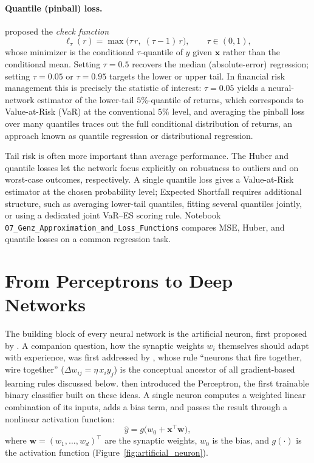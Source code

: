\documentclass[11pt,a4paper]{report}
\newcommand{\x}{\bm{x}}
\newcommand{\w}{\bm{w}}
\begin{document}
\paragraph{Quantile (pinball) loss.}  \citet{koenker1978regression} proposed the \emph{check function}
\begin{equation}
\ell_\tau(r) = \max\!\bigl(\tau\, r,\; (\tau-1)\, r\bigr), \qquad \tau \in (0,1),
\end{equation}
whose minimizer is the conditional $\tau$-quantile of $y$ given $\x$ rather than the conditional mean.  Setting $\tau = 0.5$ recovers the median (absolute-error) regression; setting $\tau = 0.05$ or $\tau = 0.95$ targets the lower or upper tail.  In financial risk management this is precisely the statistic of interest: $\tau = 0.05$ yields a neural-network estimator of the lower-tail $5\%$-quantile of returns, which corresponds to Value-at-Risk (VaR) at the conventional $5\%$ level, and averaging the pinball loss over many quantiles traces out the full conditional distribution of returns, an approach known as quantile regression or distributional regression.

\begin{remarkbox}
Tail risk is often more important than average performance.  The Huber and quantile losses let the network focus explicitly on robustness to outliers and on worst-case outcomes, respectively.  A single quantile loss gives a Value-at-Risk estimator at the chosen probability level; Expected Shortfall requires additional structure, such as averaging lower-tail quantiles, fitting several quantiles jointly, or using a dedicated joint VaR--ES scoring rule.  Notebook \texttt{07\_Genz\_Approximation\_and\_Loss\_Functions} compares MSE, Huber, and quantile losses on a common regression task.
\end{remarkbox}

\section{From Perceptrons to Deep Networks}

The building block of every neural network is the artificial neuron, first proposed by \citet{mcculloch1943logical}.  A companion question, how the synaptic weights $w_i$ themselves should adapt with experience, was first addressed by \citet{hebb1949organization}, whose rule ``neurons that fire together, wire together'' ($\Delta w_{ij} = \eta\, x_i y_j$) is the conceptual ancestor of all gradient-based learning rules discussed below.  \citet{rosenblatt1958perceptron} then introduced the Perceptron, the first trainable binary classifier built on these ideas.  A single neuron computes a weighted linear combination of its inputs, adds a bias term, and passes the result through a nonlinear activation function:
\begin{equation}
\hat{y} = g\!\big(w_0 + \x^\top \w\big),
\end{equation}
where $\w = (w_1, \dots, w_d)^\top$ are the synaptic weights, $w_0$ is the bias, and $g(\cdot)$ is the activation function (Figure~\ref{fig:artificial_neuron}).
\end{document}

